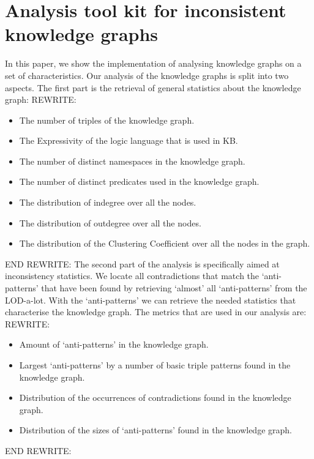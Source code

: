 \documentclass[11pt,letterpaper ,oneside ]{book}
\begin{document}
	\section{Analysis tool kit for inconsistent knowledge graphs}
	In this paper, we show the implementation of analysing knowledge graphs on a set of characteristics. Our analysis of the knowledge graphs is split into two aspects. The first part is the retrieval of general statistics about the knowledge graph:
	REWRITE:
	\begin{itemize}
		\item The number of triples of the knowledge graph.
		\item The Expressivity of the logic language that is used in KB.
		\item The number of distinct namespaces in the knowledge graph.
		\item The number of distinct predicates used in the knowledge graph.
		\item The distribution of indegree over all the nodes.
		\item The distribution of outdegree over all the nodes.
		\item The distribution of the Clustering Coefficient over all the nodes in the graph.
	\end{itemize}
	END REWRITE:
	The second part of the analysis is specifically aimed at inconsistency statistics. We locate all contradictions that match the `anti-patterns' that have been found by retrieving `almost' all `anti-patterns' from the LOD-a-lot. With the `anti-patterns' we can retrieve the needed statistics that characterise the knowledge graph. The metrics that are used in our analysis are:
	REWRITE:
	\begin{itemize}
		\item Amount of `anti-patterns' in the knowledge graph.
		\item Largest `anti-patterns' by a number of basic triple patterns found in the knowledge graph.
		\item Distribution of the occurrences of contradictions found in the knowledge graph.
		\item Distribution of the sizes of `anti-patterns' found in the knowledge graph.
	\end{itemize} 
	END REWRITE:
\end{document}
